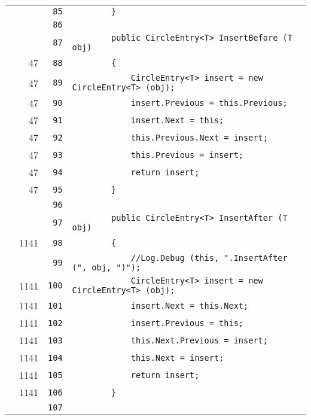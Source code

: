 \documentclass[a4paper,10pt]{article}
\begin{document}
\begin{longtable}[l]{lrrl}
\cellcolor{gray} &  & \verb~85~ & \verb~        }~\\
\cellcolor{gray} &  & \verb~86~ & \verb~~\\
\cellcolor{gray} &  & \verb~87~ & \verb~        public CircleEntry<T> InsertBefore (T obj)~\\
\cellcolor{green} & 47 & \verb~88~ & \verb~        {~\\
\cellcolor{green} & 47 & \verb~89~ & \verb~            CircleEntry<T> insert = new CircleEntry<T> (obj);~\\
\cellcolor{green} & 47 & \verb~90~ & \verb~            insert.Previous = this.Previous;~\\
\cellcolor{green} & 47 & \verb~91~ & \verb~            insert.Next = this;~\\
\cellcolor{green} & 47 & \verb~92~ & \verb~            this.Previous.Next = insert;~\\
\cellcolor{green} & 47 & \verb~93~ & \verb~            this.Previous = insert;~\\
\cellcolor{green} & 47 & \verb~94~ & \verb~            return insert;~\\
\cellcolor{green} & 47 & \verb~95~ & \verb~        }~\\
\cellcolor{gray} &  & \verb~96~ & \verb~~\\
\cellcolor{gray} &  & \verb~97~ & \verb~        public CircleEntry<T> InsertAfter (T obj)~\\
\cellcolor{green} & 1141 & \verb~98~ & \verb~        {~\\
\cellcolor{gray} &  & \verb~99~ & \verb~            //Log.Debug (this, ".InsertAfter (", obj, ")");~\\
\cellcolor{green} & 1141 & \verb~100~ & \verb~            CircleEntry<T> insert = new CircleEntry<T> (obj);~\\
\cellcolor{green} & 1141 & \verb~101~ & \verb~            insert.Next = this.Next;~\\
\cellcolor{green} & 1141 & \verb~102~ & \verb~            insert.Previous = this;~\\
\cellcolor{green} & 1141 & \verb~103~ & \verb~            this.Next.Previous = insert;~\\
\cellcolor{green} & 1141 & \verb~104~ & \verb~            this.Next = insert;~\\
\cellcolor{green} & 1141 & \verb~105~ & \verb~            return insert;~\\
\cellcolor{green} & 1141 & \verb~106~ & \verb~        }~\\
\cellcolor{gray} &  & \verb~107~ & \verb~~\\

\end{longtable}
\end{document}
